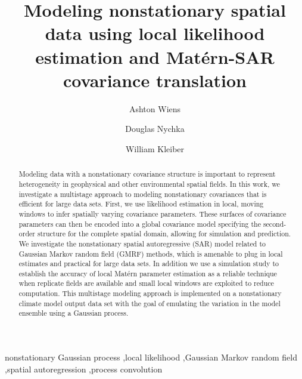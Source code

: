 \documentclass[review]{elsarticle}
\begin{document}
\begin{frontmatter}

\title{Modeling nonstationary spatial data using local likelihood estimation and Mat\'ern-SAR covariance translation}
 
\author[CU]{Ashton Wiens}
\author[CSM]{Douglas Nychka}
\author[CU]{William Kleiber}
\address[CU]{Department of Applied Mathematics, University of Colorado, Boulder, Colorado, USA}
\address[CSM]{Department of Applied Mathematics and Statistics, Colorado School of Mines, Golden, Colorado, USA}

\address{Colorado, United States}

\begin{abstract}

Modeling data with a nonstationary covariance structure is important to represent heterogeneity in geophysical and other environmental spatial fields. In this work, we investigate a multistage approach to modeling nonstationary covariances that is efficient for large data sets. First, we use likelihood estimation in local, moving windows to infer spatially varying covariance parameters. These surfaces of covariance parameters can then be encoded into a global covariance model specifying the second-order structure for the complete spatial domain, allowing for simulation and prediction. We investigate the nonstationary spatial autoregressive (SAR) model related to Gaussian Markov random field (GMRF) methods, which is amenable to plug in local estimates and practical for large data sets. In addition we use a simulation study to establish the accuracy of local Mat\'ern parameter estimation as a reliable technique when replicate fields are available and small local windows are exploited to reduce computation. This multistage modeling approach is implemented on a nonstationary climate model output data set with the goal of emulating the variation in the model ensemble using a Gaussian process.

\end{abstract}

\begin{keyword}
nonstationary Gaussian process \sep local likelihood \sep Gaussian Markov random field \sep spatial autoregression \sep process convolution
\end{keyword}

\end{frontmatter}
\end{document}

